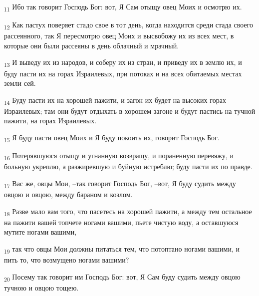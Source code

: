 \begin{tcolorbox}
\textsubscript{11} Ибо так говорит Господь Бог: вот, Я Сам отыщу овец Моих и осмотрю их.
\end{tcolorbox}
\begin{tcolorbox}
\textsubscript{12} Как пастух поверяет стадо свое в тот день, когда находится среди стада своего рассеянного, так Я пересмотрю овец Моих и высвобожу их из всех мест, в которые они были рассеяны в день облачный и мрачный.
\end{tcolorbox}
\begin{tcolorbox}
\textsubscript{13} И выведу их из народов, и соберу их из стран, и приведу их в землю их, и буду пасти их на горах Израилевых, при потоках и на всех обитаемых местах земли сей.
\end{tcolorbox}
\begin{tcolorbox}
\textsubscript{14} Буду пасти их на хорошей пажити, и загон их будет на высоких горах Израилевых; там они будут отдыхать в хорошем загоне и будут пастись на тучной пажити, на горах Израилевых.
\end{tcolorbox}
\begin{tcolorbox}
\textsubscript{15} Я буду пасти овец Моих и Я буду покоить их, говорит Господь Бог.
\end{tcolorbox}
\begin{tcolorbox}
\textsubscript{16} Потерявшуюся отыщу и угнанную возвращу, и пораненную перевяжу, и больную укреплю, а разжиревшую и буйную истреблю; буду пасти их по правде.
\end{tcolorbox}
\begin{tcolorbox}
\textsubscript{17} Вас же, овцы Мои, --так говорит Господь Бог, --вот, Я буду судить между овцою и овцою, между бараном и козлом.
\end{tcolorbox}
\begin{tcolorbox}
\textsubscript{18} Разве мало вам того, что пасетесь на хорошей пажити, а между тем остальное на пажити вашей топчете ногами вашими, пьете чистую воду, а оставшуюся мутите ногами вашими,
\end{tcolorbox}
\begin{tcolorbox}
\textsubscript{19} так что овцы Мои должны питаться тем, что потоптано ногами вашими, и пить то, что возмущено ногами вашими?
\end{tcolorbox}
\begin{tcolorbox}
\textsubscript{20} Посему так говорит им Господь Бог: вот, Я Сам буду судить между овцою тучною и овцою тощею.
\end{tcolorbox}
